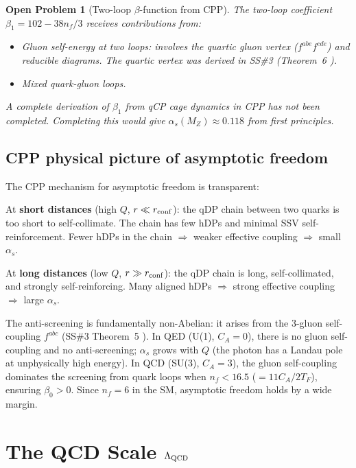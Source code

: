 \documentclass[11pt,a4paper]{article}
\newtheorem{openprob}[theorem]{Open Problem}
\newcommand{\as}{\alpha_s}
\begin{document}
\begin{openprob}[Two-loop $\beta$-function from CPP]
\label{op:alphas}
The two-loop coefficient $\beta_1 = 102 - 38n_f/3$ receives
contributions from:
\begin{itemize}
\item Gluon self-energy at two loops: involves the quartic
  gluon vertex ($f^{abe}f^{cde}$) and reducible diagrams.
  The quartic vertex was derived in SS\#3 (Theorem~6
  \citep{cpp_ss3}).
\item Mixed quark-gluon loops.
\end{itemize}
A complete derivation of $\beta_1$ from qCP cage dynamics
in CPP has not been completed.  Completing this would give
$\as(M_Z) \approx 0.118$ from first principles.
\end{openprob}

\subsection{CPP physical picture of asymptotic freedom}

The CPP mechanism for asymptotic freedom is transparent:

At \textbf{short distances} (high $Q$, $r \ll r_{\rm conf}$):
the qDP chain between two quarks is too short to self-collimate.
The chain has few hDPs and minimal SSV self-reinforcement.
Fewer hDPs in the chain $\Rightarrow$ weaker effective coupling
$\Rightarrow$ small $\as$.

At \textbf{long distances} (low $Q$, $r \gg r_{\rm conf}$):
the qDP chain is long, self-collimated, and strongly
self-reinforcing.  Many aligned hDPs $\Rightarrow$ strong
effective coupling $\Rightarrow$ large $\as$.

The anti-screening is fundamentally non-Abelian: it arises from
the 3-gluon self-coupling $f^{abc}$ (SS\#3 Theorem~5
\citep{cpp_ss3}).  In QED (U(1), $C_A = 0$), there is no
gluon self-coupling and no anti-screening; $\as$ grows with $Q$
(the photon has a Landau pole at unphysically high energy).
In QCD (SU(3), $C_A = 3$), the gluon self-coupling dominates
the screening from quark loops when $n_f < 16.5$
($= 11C_A / 2T_F$), ensuring $\beta_0 > 0$.  Since $n_f = 6$
in the SM, asymptotic freedom holds by a wide margin.

\section{The QCD Scale $\Lambda_{\rm QCD}$}
\label{sec:lambda}
\end{document}
